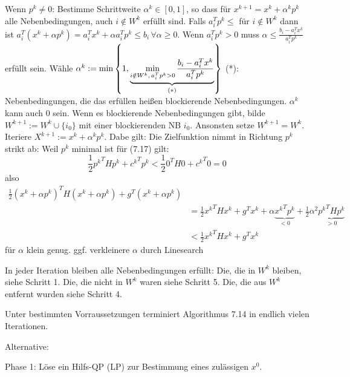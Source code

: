 \item Wenn $p^k \neq 0$: Bestimme Schrittweite $\alpha^k \in [0,1]$, so dass für $x^{k+1} = x^k + \alpha^k p^k$ alle Nebenbedingungen, auch $i \notin W^k$ erfüllt sind.
Falls $a_i^T p^k \leq$ für $i \notin W^k$ dann ist $a_i^T (x^k + \alpha p^k) = a_i^T x^k + \alpha a_i^T p^k \leq b_i \, \forall \alpha \geq 0$.
Wenn $a_i^T p^k > 0$ muss $\alpha \leq \frac{b_i - a_i^T x^k}{a_i^T p^k}$ erfüllt sein. Wähle $\alpha^k := \min \left\{1,\underbrace{\min_{i\notin W^k,\,a_i^T p^k > 0} \frac{b_i-a_i^T x^k}{a_i^T p^k}}_{(*)} \right\}$ (*): Nebenbedingungen, die das erfüllen heißen blockierende Nebenbedingungen. $\alpha^k$ kann auch $0$ sein. Wenn es blockierende Nebenbedingungen gibt, bilde $W^{k+1} := W^k \cup \{i_0\}$ mit einer blockierenden NB $i_0$. Ansonsten setze $W^{k+1} = W^k$. Iteriere $X^{k+1} := x^k + \alpha^k p^k$. Dabe gilt: Die Zielfunktion nimmt in Richtung $p^k$ strikt ab: Weil $p^k$ minimal ist für (7.17) gilt:
\[ \frac 12 {p^k}^T H p^k + {c^k}^T p^k < \frac 12 0^T H 0 + {c^k}^T 0 = 0 \]
also
\begin{align*}
\frac 12 (x^k + \alpha p^k)^T H (x^k + \alpha p^k) + g^T (x^k + \alpha p^k) \\
&= \frac 12 {x^k}^T H x^k + g^T x^k + \alpha \underbrace{ {x^k}^T p^k}_{<0} + \frac 12 \alpha^2 \underbrace{{p^k}^T H p^k}_{>0} \\
& < \frac 12 {x^k}^T H x^k + g^T x^k
\end{align*}
für $\alpha$ klein genug. ggf. verkleinere $\alpha$ durch Linesearch
\eitm


In jeder Iteration bleiben alle Nebenbedingungen erfüllt: Die, die in $W^k$ bleiben, siehe Schritt 1. Die, die nicht in $W^k$ waren siehe Schritt 5. Die, die aus $W^k$ entfernt wurden siehe Schritt 4.


Unter bestimmten Vorraussetzungen terminiert Algorithmus 7.14 in endlich vielen Iterationen.

Alternative:


Phase 1: Löse ein Hilfs-QP (LP) zur Bestimmung eines zulässigen $x^0$.




















